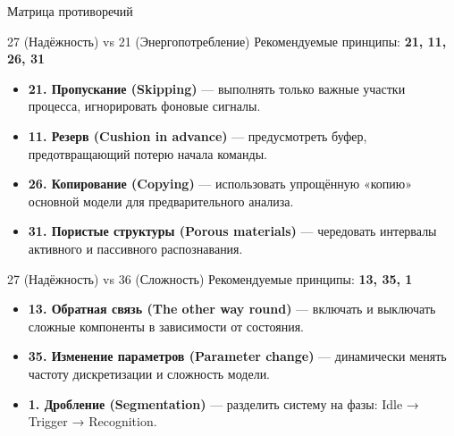 \documentclass[aspectratio=169]{beamer}
\begin{document}
\begin{frame}{Матрица противоречий}
  \begin{block}{27 (Надёжность) vs 21 (Энергопотребление)}
    Рекомендуемые принципы: \textbf{21, 11, 26, 31}
    \end{block}

    \begin{itemize}
      \item \textbf{21. Пропускание (Skipping)} — выполнять только важные участки процесса, игнорировать фоновые сигналы.
      \item \textbf{11. Резерв (Cushion in advance)} — предусмотреть буфер, предотвращающий потерю начала команды.
      \item \textbf{26. Копирование (Copying)} — использовать упрощённую «копию» основной модели для предварительного анализа.
      \item \textbf{31. Пористые структуры (Porous materials)} — чередовать интервалы активного и пассивного распознавания.
    \end{itemize}

    \bigskip
    \begin{block}{27 (Надёжность) vs 36 (Сложность)}
    Рекомендуемые принципы: \textbf{13, 35, 1}
    \end{block}

    \begin{itemize}
      \item \textbf{13. Обратная связь (The other way round)} — включать и выключать сложные компоненты в зависимости от состояния.
      \item \textbf{35. Изменение параметров (Parameter change)} — динамически менять частоту дискретизации и сложность модели.
      \item \textbf{1. Дробление (Segmentation)} — разделить систему на фазы: Idle → Trigger → Recognition.
    \end{itemize}
    \end{frame}

\end{document}
